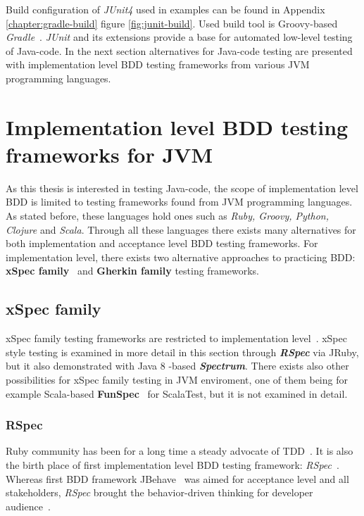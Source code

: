     Build configuration of \textit{JUnit4} used in examples can be found in Appendix \ref{chapter:gradle-build} figure \ref{fig:junit-build}.
    Used build tool is Groovy-based \textit{Gradle}~\cite{gradle}.
    \textit{JUnit} and its extensions provide a base for automated low-level testing of Java-code.
    In the next section alternatives for Java-code testing are presented with implementation level BDD testing frameworks from
    various JVM programming languages.

\section{Implementation level BDD testing frameworks for JVM}
    As this thesis is interested in testing Java-code, the scope of implementation level BDD is limited to testing frameworks
    found from JVM programming languages. As stated before, these languages hold ones such as \textit{Ruby, Groovy, Python,
    Clojure} and \textit{Scala}. Through all these languages there exists many alternatives for both implementation and
    acceptance level BDD testing frameworks. For implementation level, there exists two alternative approaches to practicing
    BDD: \textbf{xSpec family}~\cite{solis2011study} and \textbf{Gherkin family} testing frameworks.

    \subsection{xSpec family}
    xSpec family testing frameworks are restricted to implementation level~\cite{solis2011study}. xSpec style testing
    is examined in more detail in this section through \textbf{\textit{RSpec}} via JRuby, but it also demonstrated with
    Java 8 -based \textbf{\textit{Spectrum}}. There exists also other possibilities for xSpec family testing in JVM enviroment,
    one of them being for example Scala-based \textbf{FunSpec}~\cite{funspec} for ScalaTest, but it is not examined in detail.

    \subsubsection{RSpec}
    Ruby community has been for a long time a steady advocate of TDD~\cite{lerner2009forge}. It is also the birth place
    of first implementation level BDD testing framework: \textit{RSpec}~\cite{astels2006new}. Whereas first BDD framework
    JBehave~\cite{bdd2006north} was aimed for acceptance level and all stakeholders, \textit{RSpec} brought the behavior-driven thinking for developer
    audience~\cite{astels2006new}.


